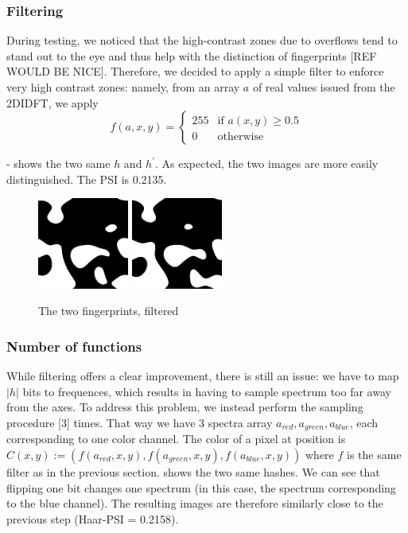 \documentclass{article}
\begin{document}
\subsubsection{Filtering}

During testing, we noticed that the high-contrast zones due to overflows tend to stand out to the eye and thus help with the distinction of fingerprints [REF WOULD BE NICE]. Therefore, we decided to apply a simple filter to enforce very high contrast zones: namely, from an array $a$ of real values issued from the 2DIDFT, we apply
$$f(a, x,y) = \begin{cases}255 & \text{if }  a(x,y) \geq 0.5\\ 
			0 & \text{otherwise} \end{cases}$$

\begin{center}
- shows the two same $h$ and $h^\prime$. As expected, the two images are more easily distinguished. The PSI is 0.2135.

\begin{figure}
    \centering
    \includegraphics[width=3cm]{figures/Filtered.png}
    \hspace{4pt}
    \includegraphics[width=3cm]{figures/FilteredP67Psi0242.png}
    \caption{The two fingerprints, filtered}
    \label{fig:oneFunc}
\end{figure}
\end{center}

\subsubsection{Number of functions}
\label{rgbSect}

While filtering offers a clear improvement, there is still an issue: we have to map $|h|$ bits to frequences, which results in having to sample spectrum too far away from the axes. To address this problem, we instead perform the sampling procedure [3] times. That way we have 3 spectra array $a_{red}, a_{green}, a_{blue}$, each corresponding to one color channel. The color of a pixel at position is $C(x,y) := (f(a_{red}, x, y), f(a_{green}, x, y), f(a_{blue}, x, y))$ where $f$ is the same filter as in the previous section.  shows the two same hashes. We can see that flipping one bit changes one spectrum (in this case, the spectrum corresponding to the blue channel). The resulting images are therefore similarly close to the previous step (Haar-PSI = 0.2158).
\end{document}
